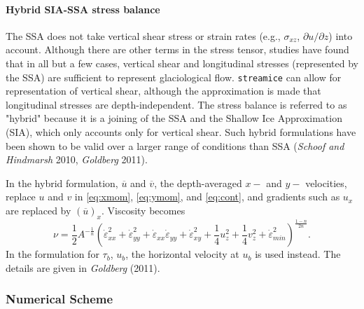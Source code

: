 \paragraph{Hybrid SIA-SSA stress balance}

The SSA does not take vertical shear stress or strain rates (e.g.,
$\sigma_{xz}$, $\partial u/\partial z$) into account. Although there are other
terms in the stress tensor, studies have found that in all but a few cases,
vertical shear and longitudinal stresses (represented by the SSA) are sufficient
to represent glaciological flow. {\tt streamice} can allow for representation of
vertical shear, although the approximation is made that longitudinal stresses
are depth-independent. The stress balance is referred to as "hybrid" because it
is a joining of the SSA and the Shallow Ice Approximation (SIA), which only
accounts only for vertical shear. Such hybrid formulations have been shown to be
valid over a larger range of conditions than SSA (\textit{Schoof and Hindmarsh}
2010, \textit{Goldberg} 2011).

In the hybrid formulation, $\overline{u}$ and $\overline{v}$, the depth-averaged
$x-$ and $y-$ velocities, replace $u$ and $v$ in \eqref{eq:xmom},
\eqref{eq:ymom}, and \eqref{eq:cont}, and gradients such as $u_x$ are replaced
by $(\overline{u})_x$. Viscosity becomes 
\begin{equation}
 \nu =
\frac{1}{2}A^{-\frac{1}{n}}\left(\dot{\varepsilon}_{xx}^2+\dot{\varepsilon}_{yy}
^2+\dot{\varepsilon}_{xx}\dot{\varepsilon}_{yy}+\dot{\varepsilon}_{xy}^2+\frac{1
}{4}u_z^2+\frac{1}{4}v_z^2+\dot{\varepsilon}_{min}^2\right)^{\frac{1-n}{2n}}.
\end{equation}
In the formulation for $\tau_b$, $u_b$, the horizontal velocity at $u_b$ is used
instead. The details are given in \textit{Goldberg} (2011).

\subsubsection{Numerical Scheme}




